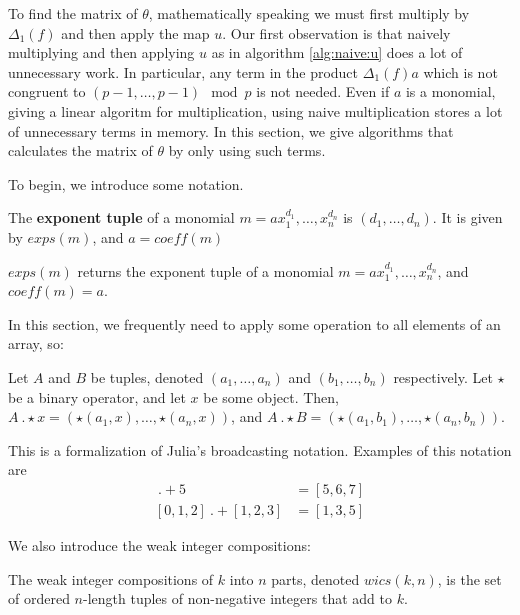 \newcommand{\triv}{\texttt{TRIV}}
\newcommand{\merge}{\texttt{MERGE}}
\newcommand{\wics}{\texttt{WICS}}

To find the matrix of \(\theta\), mathematically
speaking we must first multiply by \(\Delta_{1}(f)\) 
and then apply the map \(u\).
Our first observation is that naively 
multiplying and then applying \(u\) 
as in algorithm \ref{alg:naive:u}
does a lot of unnecessary work.
In particular, any term in the 
product \(\Delta_{1}(f)a\) which 
is not congruent to 
\((p-1, \ldots, p-1) \mod p\)
is not needed. 
Even if \(a\) is a monomial, giving a linear
algoritm for multiplication, using naive
multiplication stores a lot of unnecessary terms
in memory.
In this section, we give algorithms that calculates
the matrix of \(\theta\) by only
using such terms.

To begin, we introduce some notation.

\begin{defn}
    The \textbf{exponent tuple} of a monomial $m = ax_{1}^{d_1}, \dots, x_{n}^{d_n}$ is $(d_1, \dots, d_n)$. It is given by $exps(m)$, and $a = coeff(m)$
\end{defn}

\begin{nota}
    $exps(m)$ returns the exponent tuple of a monomial $m = ax_{1}^{d_1}, \dots, x_{n}^{d_n}$, and $coeff(m) = a$.
\end{nota}

In this section, we frequently need to apply some operation to all elements of an array, so:
\begin{nota}
    Let $A$ and $B$ be tuples, denoted $(a_1, \dots, a_n)$ and $(b_1, \dots, b_n)$ respectively. Let $\star$ be a binary operator, and let $x$ be some object. Then, $A ~.\star x= (\star(a_1, x), \dots, \star(a_n, x))$, and $A ~.\star B = (\star(a_1, b_1), \dots, \star(a_n, b_n))$.
\end{nota}

This is a formalization of Julia's broadcasting notation. 
Examples of this notation are 
\begin{align*}
    [0, 1, 2] ~.+ 5 &= [5, 6, 7] \\
    [0, 1, 2] ~.+ [1, 2, 3] &= [1, 3, 5]
\end{align*}

We also introduce the weak integer compositions:

\begin{defn}
    The weak integer compositions of $k$ into $n$ parts, denoted $wics(k, n)$, is the set of ordered $n$-length tuples of non-negative integers that add to $k$.
\end{defn}

